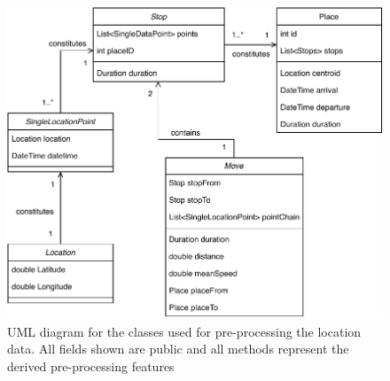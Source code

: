 \begin{figure}
    \centering
    \includegraphics[width=\textwidth]{./images/Mobility-Preprocessing.pdf}
    \caption{UML diagram for the classes used for pre-processing the location data. All fields shown are public and all methods represent the derived pre-processing features}
    \label{fig:my_label}
\end{figure}
